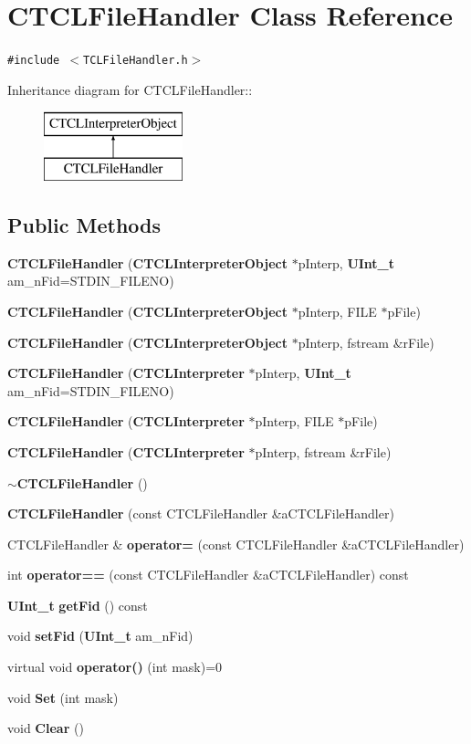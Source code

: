 \section{CTCLFile\-Handler  Class Reference}
\label{classCTCLFileHandler}
{\tt \#include $<$TCLFile\-Handler.h$>$}

Inheritance diagram for CTCLFile\-Handler::\begin{figure}[H]
\begin{center}
\leavevmode
\includegraphics[height=2cm]{classCTCLFileHandler}
\end{center}
\end{figure}
\subsection*{Public Methods}
\begin{CompactItemize}
\item 
{\bf CTCLFile\-Handler} ({\bf CTCLInterpreter\-Object} $\ast$p\-Interp, {\bf UInt\_\-t} am\_\-n\-Fid=STDIN\_\-FILENO)
\item 
{\bf CTCLFile\-Handler} ({\bf CTCLInterpreter\-Object} $\ast$p\-Interp, FILE $\ast$p\-File)
\item 
{\bf CTCLFile\-Handler} ({\bf CTCLInterpreter\-Object} $\ast$p\-Interp, fstream \&r\-File)
\item 
{\bf CTCLFile\-Handler} ({\bf CTCLInterpreter} $\ast$p\-Interp, {\bf UInt\_\-t} am\_\-n\-Fid=STDIN\_\-FILENO)
\item 
{\bf CTCLFile\-Handler} ({\bf CTCLInterpreter} $\ast$p\-Interp, FILE $\ast$p\-File)
\item 
{\bf CTCLFile\-Handler} ({\bf CTCLInterpreter} $\ast$p\-Interp, fstream \&r\-File)
\item 
{\bf $\sim$CTCLFile\-Handler} ()
\item 
{\bf CTCLFile\-Handler} (const CTCLFile\-Handler \&a\-CTCLFile\-Handler)
\item 
CTCLFile\-Handler \& {\bf operator=} (const CTCLFile\-Handler \&a\-CTCLFile\-Handler)
\item 
int {\bf operator==} (const CTCLFile\-Handler \&a\-CTCLFile\-Handler) const
\item 
{\bf UInt\_\-t} {\bf get\-Fid} () const
\item 
void {\bf set\-Fid} ({\bf UInt\_\-t} am\_\-n\-Fid)
\item 
virtual void {\bf operator()} (int mask)=0
\item 
void {\bf Set} (int mask)
\item 
void {\bf Clear} ()
\end{CompactItemize}
